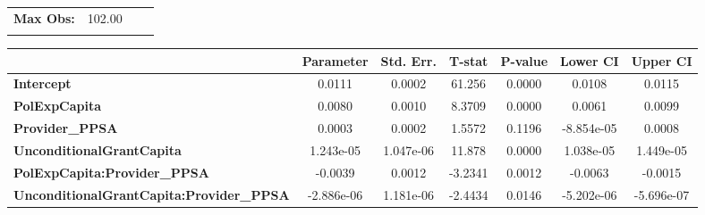 \begin{center}
\begin{tabular}{lclc}
\textbf{Max Obs:}                                &       102.00       & \textbf{                     }   &                  \\
\textbf{}                                        &                    & \textbf{                     }   &                  \\
\bottomrule
\end{tabular}
\begin{tabular}{lcccccc}
                                                 & \textbf{Parameter} & \textbf{Std. Err.} & \textbf{T-stat} & \textbf{P-value} & \textbf{Lower CI} & \textbf{Upper CI}  \\
\midrule
\textbf{Intercept}                               &       0.0111       &       0.0002       &      61.256     &      0.0000      &       0.0108      &       0.0115       \\
\textbf{PolExpCapita}                            &       0.0080       &       0.0010       &      8.3709     &      0.0000      &       0.0061      &       0.0099       \\
\textbf{Provider\_PPSA}                          &       0.0003       &       0.0002       &      1.5572     &      0.1196      &     -8.854e-05    &       0.0008       \\
\textbf{UnconditionalGrantCapita}                &     1.243e-05      &     1.047e-06      &      11.878     &      0.0000      &     1.038e-05     &     1.449e-05      \\
\textbf{PolExpCapita:Provider\_PPSA}             &      -0.0039       &       0.0012       &     -3.2341     &      0.0012      &      -0.0063      &      -0.0015       \\
\textbf{UnconditionalGrantCapita:Provider\_PPSA} &     -2.886e-06     &     1.181e-06      &     -2.4434     &      0.0146      &     -5.202e-06    &     -5.696e-07     \\
\bottomrule
\end{tabular}
\end{center}